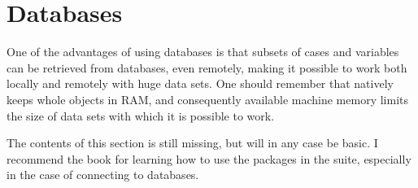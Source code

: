 \documentclass[krantz2]{krantz}\usepackage{knitr}%
\begin{document}
\section{Databases}\label{sec:data:db}

One of the advantages of using databases is that subsets of cases and variables can be retrieved from databases, even remotely, making it possible to work both locally and remotely with huge data sets. One should remember that \Rlang natively keeps whole objects in RAM, and consequently available machine memory limits the size of data sets with which it is possible to work.

\begin{infobox}
The contents of this section is still missing, but will in any case be basic. I recommend the book  \autocite{Wickham2017} for learning how to use the packages in the  suite, especially in the case of connecting to databases.
\end{infobox}
\end{document}
